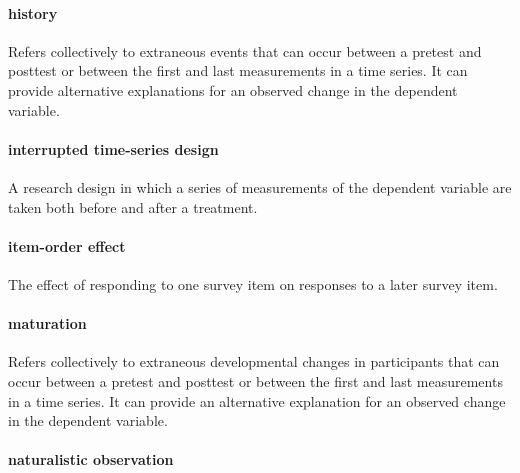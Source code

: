 \documentclass[
]{krantz}
\begin{document}
\hypertarget{history}{%
\paragraph*{history}\label{history}}

Refers collectively to extraneous events that can occur between a pretest and posttest or between the first and last measurements in a time series. It can provide alternative explanations for an observed change in the dependent variable.

\hypertarget{interrupted-time-series-design-1}{%
\paragraph*{interrupted time-series design}\label{interrupted-time-series-design-1}}

A research design in which a series of measurements of the dependent variable are taken both before and after a treatment.

\hypertarget{item-order-effect}{%
\paragraph*{item-order effect}\label{item-order-effect}}

The effect of responding to one survey item on responses to a later survey item.

\hypertarget{maturation}{%
\paragraph*{maturation}\label{maturation}}

Refers collectively to extraneous developmental changes in participants that can occur between a pretest and posttest or between the first and last measurements in a time series. It can provide an alternative explanation for an observed change in the dependent variable.

\hypertarget{naturalistic-observation-1}{%
\paragraph*{naturalistic observation}\label{naturalistic-observation-1}}
\end{document}
